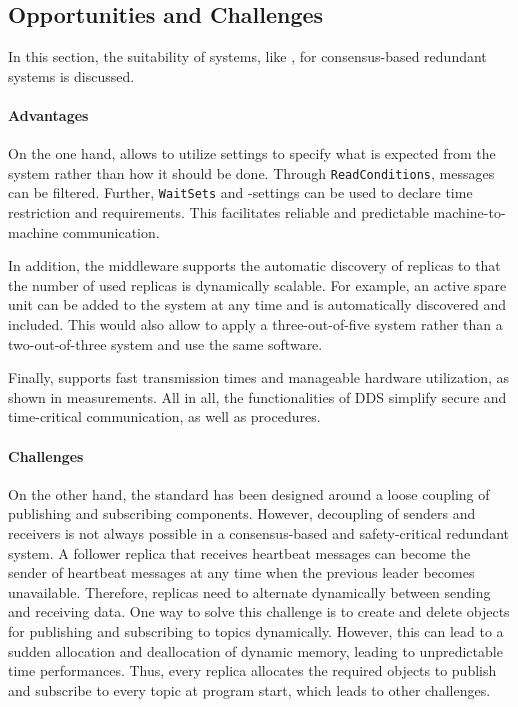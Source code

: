 \subsection{Opportunities and Challenges}

In this section, the suitability of  systems, like , for consensus-based redundant systems is discussed.

\paragraph{Advantages}
On the one hand,  allows to utilize  settings to specify what is expected from the system rather than how it should be done.
Through \texttt{ReadConditions}, messages can be filtered.
Further, \texttt{WaitSets} and -settings can be used to declare time restriction and requirements.
This facilitates reliable and predictable machine-to-machine communication.

In addition, the middleware supports the automatic discovery of replicas to that the number of used replicas is dynamically scalable.
For example, an active spare unit can be added to the system at any time and is automatically discovered and included.
This would also allow to apply a three-out-of-five system rather than a two-out-of-three system and use the same software.

Finally,  supports fast transmission times and manageable hardware utilization, as shown in measurements.
All in all, the functionalities of DDS simplify secure and time-critical communication, as well as procedures.

\paragraph{Challenges}
On the other hand, the  standard has been designed around a loose coupling of publishing and subscribing components.
However, decoupling of senders and receivers is not always possible in a consensus-based and safety-critical redundant system.
A follower replica that receives heartbeat messages can become the sender of heartbeat messages at any time when the previous leader becomes unavailable.
Therefore, replicas need to alternate dynamically between sending and receiving data.
One way to solve this challenge is to create and delete objects for publishing and subscribing to topics dynamically.
However, this can lead to a sudden allocation and deallocation of dynamic memory, leading to unpredictable time performances.
Thus, every replica allocates the required objects to publish and subscribe to every topic at program start, which leads to other challenges.
\\

